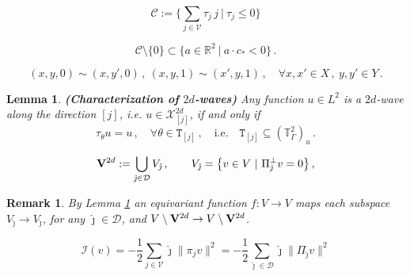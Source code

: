 \documentclass[10pt,a4paper]{amsart}
\newtheorem{lemma}{Lemma}
\newtheorem{remark}{Remark}
\newcommand{\R}{{\mathbb R}}
\newcommand{\T}{{\mathbb T}}
\newcommand{\cC}{{\mathcal C}}
\newcommand{\cD}{{\mathcal D}}
\newcommand{\cI}{{\mathcal I}}
\newcommand{\cV}{{\mathcal V}}
\newcommand{\cX}{{\mathcal X}}
\newcommand{\twod}{{2d}}
\begin{document}
\begin{equation}\label{defC}
    \cC := \Big\{ \sum_{j \in \cV } 
    \tau_j \, j  \ \big| \ \tau_j \leq 0 \Big\}
\end{equation}

\begin{equation}\label{eq:ilcono}
\cC \setminus \{0\} \subset \big\{ a \in \R^2 \ | \ a \cdot c_* < 0  \big\} \, . 
\end{equation} 

\begin{equation}
\label{eqrela}
(x,y,0)\sim(x,y',0) \, ,\
(x,y,1)\sim(x',y,1) \, ,\quad
\forall x,x'\in X \, ,\ y,y'\in Y \, .
\end{equation}

     \begin{lemma}\label{ortoges}
    {\bf (Characterization of $2d$-waves)}
    Any function 
            $u \in L^2  $ is a 
            $ 2 d$-wave along the direction $ [j] $, i.e.  $ u\in \cX_{[j]}^{\twod} $, if and only if 
    \begin{equation}\label{One dimensional iff simmetric}
         \tau_\theta u=u \, , \quad \forall \theta\in 
                {\mathtt T}_{[j]} \, , \quad \text{i.e.} \quad {\mathtt T}_{[j]}\subseteq (\T_\Gamma^2)_u\, .
            \end{equation}
    \end{lemma}

\begin{equation}\label{V2d}
{\bf V}^{\twod} := \bigcup_{\hat\jmath \in \cD} V_{\hat\jmath}
\, , \qquad 
V_{\hat\jmath} = \big\{ v \in V \ | \ 
\Pi_{\hat\jmath}^\bot v = 0  \big\} \, , 
\end{equation}

 \begin{remark}\label{rem:Vinv}
By Lemma \ref{ortoges}
an equivariant function $ f : V \to V $ 
maps each subspace $ V_{\hat\jmath} \to V_{\hat\jmath}  $,  for any 
$ \hat\jmath \in \cD  $,  and $ V \setminus {\bf V}^{\twod}
\to V \setminus {\bf V}^{\twod} $. 
\end{remark}

    \begin{equation}\label{eq:cI}
        \cI(v)=-\frac12\sum_{j\in \cV} \hat\jmath \|\pi_{j} v\|^2=-\frac12\sum_{\hat\jmath \in \cD} \hat\jmath \|\Pi_{\hat\jmath} v\|^2
    \end{equation}
\end{document}
